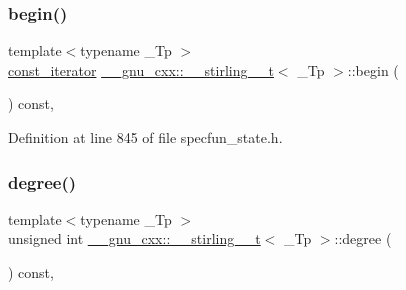 \mbox{\label{struct____gnu__cxx_1_1____stirling__1__t_ac3969e29b4400ce584d50f1856e2f823}} 
\subsubsection{\texorpdfstring{begin()}{begin()}\hspace{0.1cm}{\footnotesize\ttfamily [2/2]}}
{\footnotesize\ttfamily template$<$typename \+\_\+\+Tp $>$ \\
\hyperlink{struct____gnu__cxx_1_1____stirling__1__t_a2b4e459dac02038428602f6315b97941}{const\+\_\+iterator} \hyperlink{struct____gnu__cxx_1_1____stirling__1__t}{\+\_\+\+\_\+gnu\+\_\+cxx\+::\+\_\+\+\_\+stirling\+\_\+\_\+t}$<$ \+\_\+\+Tp $>$\+::begin (\begin{DoxyParamCaption}{ }\end{DoxyParamCaption}) const\hspace{0.3cm}{\ttfamily [inline]}, {\ttfamily [noexcept]}}



Definition at line 845 of file specfun\+\_\+state.\+h.

\mbox{\label{struct____gnu__cxx_1_1____stirling__1__t_a5deb39674b9b08887f6ce429366fb04a}} 
\subsubsection{\texorpdfstring{degree()}{degree()}}
{\footnotesize\ttfamily template$<$typename \+\_\+\+Tp $>$ \\
unsigned int \hyperlink{struct____gnu__cxx_1_1____stirling__1__t}{\+\_\+\+\_\+gnu\+\_\+cxx\+::\+\_\+\+\_\+stirling\+\_\+\_\+t}$<$ \+\_\+\+Tp $>$\+::degree (\begin{DoxyParamCaption}{ }\end{DoxyParamCaption}) const\hspace{0.3cm}{\ttfamily [inline]}, {\ttfamily [noexcept]}}



